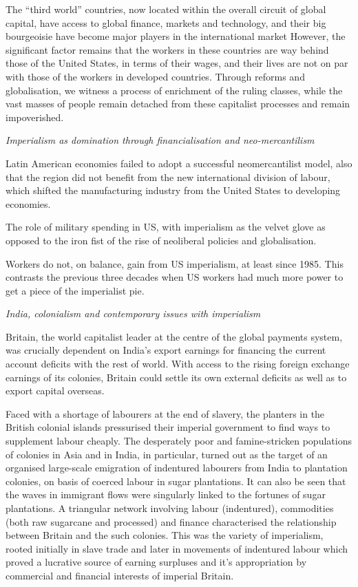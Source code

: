 \documentclass[
]{book}
\begin{document}
The ``third world'' countries, now located within the overall circuit of global capital, have access to global finance, markets and technology, and their big bourgeoisie have become major players in the international market However, the significant factor remains that the workers in these countries are way behind those of the United States, in terms of their wages, and their lives are not on par with those of the workers in developed countries. Through reforms and globalisation, we witness a process of enrichment of the ruling classes, while the vast masses of people remain detached from these capitalist processes and remain impoverished.

\emph{Imperialism as domination through financialisation and neo-mercantilism}

Latin American economies failed to adopt a successful neomercantilist model, also that the region did not benefit from the new international division of labour, which shifted the manufacturing industry from the United States to developing economies.

The role of military spending in US, with imperialism as the velvet glove as opposed to the iron fist of the rise of neoliberal policies and globalisation.

Workers do not, on balance, gain from US imperialism, at least since 1985. This contrasts the previous three decades when US workers had much more power to get a piece of the imperialist pie.

\emph{India, colonialism and contemporary issues with imperialism}

Britain, the world capitalist leader at the centre of the global payments system, was crucially dependent on India's export earnings for financing the current account deficits with the rest of world. With access to the rising foreign exchange earnings of its colonies, Britain could settle its own external deficits as well as to export capital overseas.

Faced with a shortage of labourers at the end of slavery, the planters in the British colonial islands pressurised their imperial government to find ways to supplement labour cheaply. The desperately poor and famine-stricken populations of colonies in Asia and in India, in particular, turned out as the target of an organised large-scale emigration of indentured labourers from India to plantation colonies, on basis of coerced labour in sugar plantations. It can also be seen that the waves in immigrant flows were singularly linked to the fortunes of sugar plantations. A triangular network involving labour (indentured), commodities (both raw sugarcane and processed) and finance characterised the relationship between Britain and the such colonies. This was the variety of imperialism, rooted initially in slave trade and later in movements of indentured labour which proved a lucrative source of earning surpluses and it's appropriation by commercial and financial interests of imperial Britain.
\end{document}
